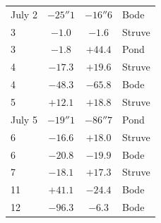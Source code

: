 \begin{center}
\begin{tabular}{l|c|c|l}
July 2  &  $-25''1$  &  $-16''6$  &  Bode  \\
3  &  $-1.0$  &  $-1.6$  &  Struve  \\
3  &  $-1.8$  &  $+44.4$  &  Pond  \\
4  &  $-17.3$  &  $+19.6$  &  Struve  \\
4  &  $-48.3$  &  $-65.8$  &  Bode  \\
5  &  $+12.1$  &  $+18.8$  &  Struve  \\
\hline
 July 5  &  $-19''1$  &  $-86''7$  &  Pond  \\
 6  &  $-16.6$  &  $+18.0$  &  Struve  \\
 6  &  $-20.8$  &  $-19.9$  &  Bode  \\
 7  &  $-18.1$  &  $+17.3$  &  Struve  \\
 11  &  $+41.1$  &  $-24.4$  &  Bode  \\
 12  &  $-96.3$  &  $-6.3$  &  Bode  \\
\end{tabular}
\end{center}

